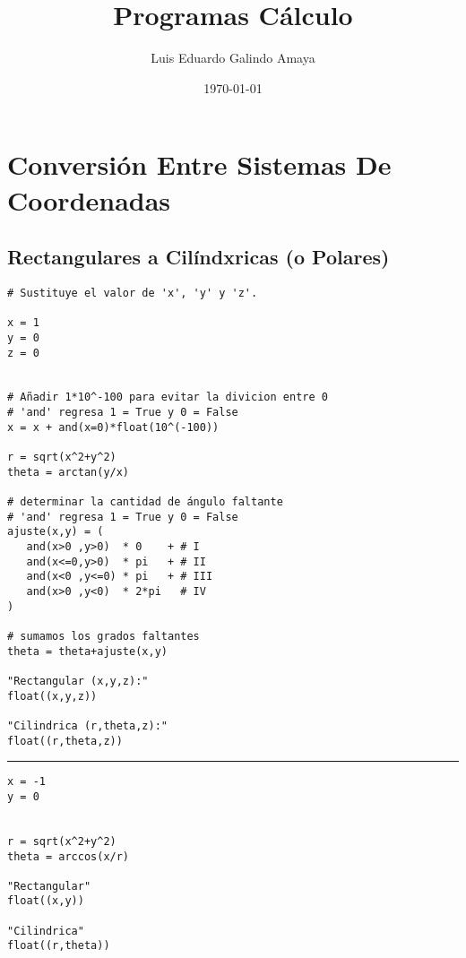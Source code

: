 \documentclass{article}
\author{Luis Eduardo Galindo Amaya}
\date{\today}
\title{Programas Cálculo}
\begin{document}
\maketitle
\tableofcontents

\newpage 

\section{Conversión Entre Sistemas De Coordenadas}
\label{sec:org95213f3}
\subsection{Rectangulares a Cilíndxricas (o Polares)}
\label{sec:orga157a2d}
\begin{verbatim}
# Sustituye el valor de 'x', 'y' y 'z'.

x = 1
y = 0
z = 0


# Añadir 1*10^-100 para evitar la divicion entre 0
# 'and' regresa 1 = True y 0 = False
x = x + and(x=0)*float(10^(-100))

r = sqrt(x^2+y^2)
theta = arctan(y/x)

# determinar la cantidad de ángulo faltante
# 'and' regresa 1 = True y 0 = False
ajuste(x,y) = ( 
   and(x>0 ,y>0)  * 0    + # I
   and(x<=0,y>0)  * pi   + # II
   and(x<0 ,y<=0) * pi   + # III
   and(x>0 ,y<0)  * 2*pi   # IV
)

# sumamos los grados faltantes
theta = theta+ajuste(x,y)

"Rectangular (x,y,z):"
float((x,y,z))

"Cilindrica (r,theta,z):"
float((r,theta,z))
\end{verbatim}

\noindent\rule{\textwidth}{0.5pt}

\begin{verbatim}
x = -1
y = 0


r = sqrt(x^2+y^2)
theta = arccos(x/r)

"Rectangular"
float((x,y))

"Cilindrica"
float((r,theta))
\end{verbatim}

\newpage 
\end{document}
